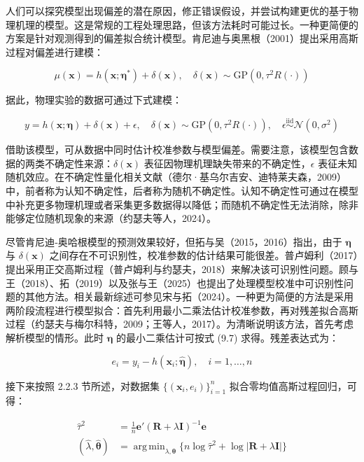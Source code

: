 \documentclass{ctexart}
\DeclareMathOperator*{\argmin}{arg\,min}
\begin{document}
人们可以探究模型出现偏差的潜在原因，修正错误假设，并尝试构建更优的基于物理机理的模型。这是常规的工程处理思路，但该方法耗时可能过长。一种更简便的方案是针对观测得到的偏差拟合统计模型。肯尼迪与奥黑根（2001）提出采用高斯过程对偏差进行建模：

\begin{equation*}
\mu(\boldsymbol{x})=h(\boldsymbol{x};\boldsymbol{\eta}^*)+\delta(\boldsymbol{x}),\quad\delta(\boldsymbol{x})\sim\mathrm{GP}(0,\tau^2R(\cdot))
\end{equation*}

据此，物理实验的数据可通过下式建模：

\begin{equation*}
y=h(\boldsymbol{x};\boldsymbol{\eta})+\delta(\boldsymbol{x})+\epsilon,\quad\delta(\boldsymbol{x})\sim\mathrm{GP}(0,\tau^2R(\cdot)),\quad\epsilon\stackrel{\text{iid}}{\sim}\mathcal{N}(0,\sigma^2)
\tag{9.15}
\end{equation*}

借助该模型，可从数据中同时估计校准参数与模型偏差。需要注意，该模型包含数据的两类不确定性来源：$\delta(\boldsymbol{x})$ 表征因物理机理缺失带来的不确定性，$\epsilon$ 表征未知随机效应。在不确定性量化相关文献（德尔·基乌尔吉安、迪特莱夫森，2009）中，前者称为认知不确定性，后者称为随机不确定性。认知不确定性可通过在模型中补充更多物理机理或者采集更多数据得以降低；而随机不确定性无法消除，除非能够定位随机现象的来源（约瑟夫等人，2024）。

尽管肯尼迪‑奥哈根模型的预测效果较好，但拓与吴（2015，2016）指出，由于 $\boldsymbol{\eta}$ 与 $\delta(\boldsymbol{x})$ 之间存在不可识别性，校准参数的估计结果可能很差。普卢姆利（2017）提出采用正交高斯过程（普卢姆利与约瑟夫，2018）来解决该可识别性问题。顾与王（2018）、拓（2019）以及张与王（2025）也提出了处理模型校准中可识别性问题的其他方法。相关最新综述可参见宋与拓（2024）。一种更为简便的方法是采用两阶段流程进行模型拟合：首先利用最小二乘法估计校准参数，再对残差拟合高斯过程（约瑟夫与梅尔科特，2009；王等人，2017）。为清晰说明该方法，首先考虑解析模型的情形。此时 $\boldsymbol{\eta}$ 的最小二乘估计可按式 (9.7) 求得。残差表达式为：

\begin{equation*}
e_i=y_i-h(\boldsymbol{x}_i;\widehat{\boldsymbol{\eta}}),\quad i=1,\dots,n
\end{equation*}

接下来按照 2.2.3 节所述，对数据集 $\{(\boldsymbol{x}_i,e_i)\}_{i=1}^n$ 拟合零均值高斯过程回归，可得：

\begin{align*}
\widehat{\tau}^2&=\frac{1}{n}\boldsymbol{e}'(\boldsymbol{R}+\lambda\boldsymbol{I})^{-1}\boldsymbol{e}\\
(\widehat{\lambda},\widehat{\boldsymbol{\theta}})&=\argmin_{\lambda,\boldsymbol{\theta}}\{n\log\widehat{\tau}^2+\log|\boldsymbol{R}+\lambda\boldsymbol{I}|\}
\end{align*}
\end{document}
